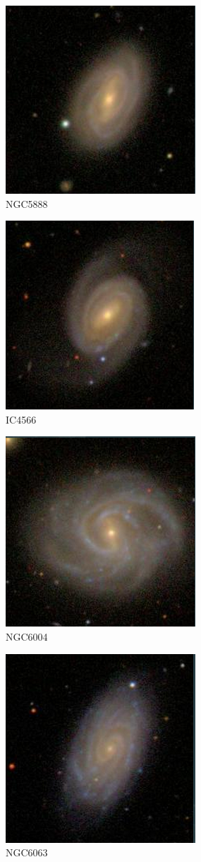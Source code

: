 \documentclass[9pt]{revtex4-1}
\begin{document}
\begin{figure}
\includegraphics[scale=0.3]{NGC5888.png}
\caption{NGC5888}
\end{figure}
\begin{figure}
\includegraphics[scale=0.3]{IC4566.png}
\caption{IC4566}
\end{figure}
\begin{figure}
\includegraphics[scale=0.3]{NGC6004.png}
\caption{NGC6004}
\end{figure}
\begin{figure}
\includegraphics[scale=0.3]{NGC6063.png}
\caption{NGC6063}
\end{figure}
\end{document}
